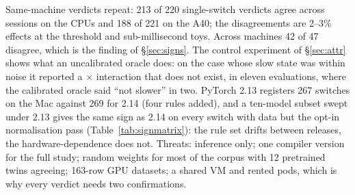 \label{sec:threats}
Same-machine verdicts repeat: 213 of 220 single-switch verdicts agree across sessions on the CPUs and 188 of 221 on
the A40; the disagreements are 2--3\% effects at the threshold and sub-millisecond toys. Across machines 42 of 47
disagree, which is the finding of \S\ref{sec:signs}. The control experiment of \S\ref{sec:attr} shows what an
uncalibrated oracle does: on the case whose slow state was within noise it reported a $\times$
 interaction that does not exist, in eleven evaluations, where the calibrated oracle said
``not slower'' in two. PyTorch 2.13 registers 267 switches on the Mac against 269 for 2.14 (four rules added), and a ten-model
subset swept under 2.13 gives the same sign as 2.14 on every switch with data but the opt-in normalisation pass
(Table~\ref{tab:signmatrix}): the rule set drifts between releases, the hardware-dependence does not. Threats: inference
only; one compiler version for the full study; random weights for most of the corpus with 12 pretrained twins
agreeing; 163-row GPU datasets; a shared VM and rented pods, which is why every verdict needs two confirmations.
